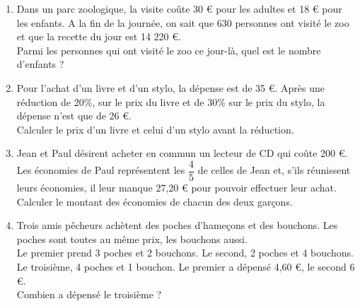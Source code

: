 \documentclass[a4paper,11pt,exos]{nsi} %
\begin{document}
\begin{exercice}[]
	\begin{enumerate}
		\item 	Dans un parc zoologique, la visite coûte 30 € pour les adultes et 18 € pour les enfants. A la fin de la journée, on sait que 630 personnes ont visité le zoo et que la recette du jour est 14 220 €.\\
		Parmi les personnes qui ont visité le zoo ce jour-là, quel est le nombre d’enfants ?
		
		\item 	Pour l’achat d’un livre et d’un stylo, la dépense est de 35 €. Après une réduction de 20\%, sur le prix du livre et de 30\% sur le prix du stylo, la dépense n’est que de 26 €.\\
		Calculer le prix d’un livre et celui d’un stylo avant la réduction.
		
		\item	Jean et Paul désirent acheter en commun un lecteur de CD qui coûte 200 €.\\
		Les économies de Paul représentent les $\dfrac{4}{5}$ de celles de Jean et, s’ils réunissent leurs économies, il leur manque 27,20 € pour pouvoir effectuer leur achat.\\ 
		Calculer le montant des économies de chacun des deux garçons.
		
		\item	Trois amis pêcheurs achètent des poches d’hameçons et des bouchons. Les poches sont toutes au même prix, les bouchons aussi.\\
		Le premier prend 3 poches et 2 bouchons. Le second, 2 poches et 4 bouchons. Le troisième, 4 poches et 1 bouchon. Le premier a dépensé 4,60 €, le second 6 €.\\ Combien a dépensé le troisième ?
		
	\end{enumerate}
\end{exercice}
\end{document}
